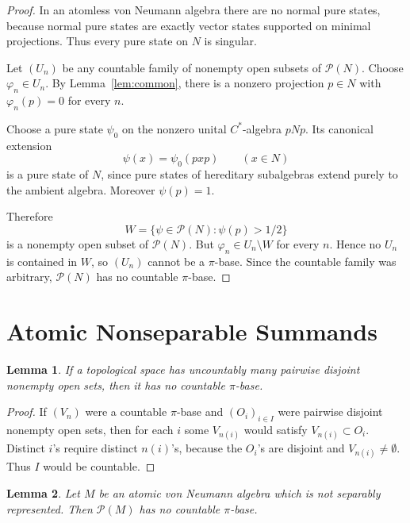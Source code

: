 \documentclass[11pt]{article}
\newtheorem{lemma}{Lemma}
\newcommand{\Pcal}{\mathcal P}
\begin{document}
\begin{proof}
In an atomless von Neumann algebra there are no normal pure states, because
normal pure states are exactly vector states supported on minimal
projections.  Thus every pure state on \(N\) is singular.

Let \((U_n)\) be any countable family of nonempty open subsets of
\(\Pcal(N)\).  Choose \(\varphi_n\in U_n\).  By Lemma~\ref{lem:common}, there
is a nonzero projection \(p\in N\) with \(\varphi_n(p)=0\) for every \(n\).

Choose a pure state \(\psi_0\) on the nonzero unital \(C^*\)-algebra
\(pNp\).  Its canonical extension
\[
        \psi(x)=\psi_0(pxp)\qquad(x\in N)
\]
is a pure state of \(N\), since pure states of hereditary subalgebras extend
purely to the ambient algebra.  Moreover \(\psi(p)=1\).

Therefore
\[
        W=\{\psi\in\Pcal(N):\psi(p)>1/2\}
\]
is a nonempty open subset of \(\Pcal(N)\).  But \(\varphi_n\in U_n\setminus W\)
for every \(n\).  Hence no \(U_n\) is contained in \(W\), so \((U_n)\) cannot
be a \(\pi\)-base.  Since the countable family was arbitrary, \(\Pcal(N)\)
has no countable \(\pi\)-base.
\end{proof}

\section*{Atomic Nonseparable Summands}

\begin{lemma}
\label{lem:disjoint}
If a topological space has uncountably many pairwise disjoint nonempty open
sets, then it has no countable \(\pi\)-base.
\end{lemma}

\begin{proof}
If \((V_n)\) were a countable \(\pi\)-base and \((O_i)_{i\in I}\) were
pairwise disjoint nonempty open sets, then for each \(i\) some \(V_{n(i)}\)
would satisfy \(V_{n(i)}\subset O_i\).  Distinct \(i\)'s require distinct
\(n(i)\)'s, because the \(O_i\)'s are disjoint and \(V_{n(i)}\ne\emptyset\).
Thus \(I\) would be countable.
\end{proof}

\begin{lemma}
\label{lem:atomic}
Let \(M\) be an atomic von Neumann algebra which is not separably represented.
Then \(\Pcal(M)\) has no countable \(\pi\)-base.
\end{lemma}
\end{document}
